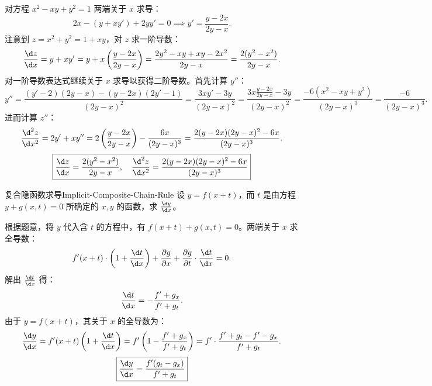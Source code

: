 \begin{solution}
    对方程 $x^2 - xy + y^2 = 1$ 两端关于 $x$ 求导：
    \begin{equation}
        2x - (y + x y') + 2yy' = 0 \implies y' = \frac{y - 2x}{2y - x}.
    \end{equation}
    注意到 $z = x^2 + y^2 = 1 + xy$，对 $z$ 求一阶导数：
    \begin{equation}
        \frac{\d z}{\d x} = y + xy' = y + x \left( \frac{y - 2x}{2y - x} \right) = \frac{2y^2 - xy + xy - 2x^2}{2y - x} = \frac{2(y^2 - x^2)}{2y - x}.
    \end{equation}
    对一阶导数表达式继续关于 $x$ 求导以获得二阶导数。首先计算 $y''$：
    \begin{equation}
        y'' = \frac{(y' - 2)(2y - x) - (y - 2x)(2y' - 1)}{(2y - x)^2} = \frac{3xy' - 3y}{(2y - x)^2} = \frac{3x\frac{y - 2x}{2y - x} - 3y}{(2y - x)^2} = \frac{-6(x^2 - xy + y^2)}{(2y - x)^3} = \frac{-6}{(2y - x)^3}.
    \end{equation}
    进而计算 $z''$：
    \begin{equation}
        \frac{\d^2 z}{\d x^2} = 2y' + xy'' = 2 \left( \frac{y - 2x}{2y - x} \right) - \frac{6x}{(2y - x)^3} = \frac{2(y - 2x)(2y - x)^2 - 6x}{(2y - x)^3}.
    \end{equation}
    \begin{equation}
        \boxed{\frac{\d z}{\d x} = \frac{2(y^2 - x^2)}{2y - x}, \quad \frac{\d^2 z}{\d x^2} = \frac{2(y - 2x)(2y - x)^2 - 6x}{(2y - x)^3}}
    \end{equation}
\end{solution}

\begin{problem}{复合隐函数求导}{Implicit-Composite-Chain-Rule}
    设 $y = f(x + t)$，而 $t$ 是由方程 $y + g(x, t) = 0$ 所确定的 $x, y$ 的函数，求 $\frac{\d y}{\d x}$。
\end{problem}

\begin{solution}
    根据题意，将 $y$ 代入含 $t$ 的方程中，有 $f(x + t) + g(x, t) = 0$。两端关于 $x$ 求全导数：
    \begin{equation}
        f'(x + t) \cdot \left( 1 + \frac{\d t}{\d x} \right) + \frac{\partial g}{\partial x} + \frac{\partial g}{\partial t} \cdot \frac{\d t}{\d x} = 0. \label{eq:total-diff}
    \end{equation}
    解出 $\frac{\d t}{\d x}$ 得：
    \begin{equation}
        \frac{\d t}{\d x} = -\frac{f' + g_x}{f' + g_t}.
    \end{equation}
    由于 $y = f(x + t)$，其关于 $x$ 的全导数为：
    \begin{equation}
        \frac{\d y}{\d x} = f'(x + t) \left( 1 + \frac{\d t}{\d x} \right) = f' \left( 1 - \frac{f' + g_x}{f' + g_t} \right) = f' \cdot \frac{f' + g_t - f' - g_x}{f' + g_t}.
    \end{equation}
    \begin{equation}
        \boxed{\frac{\d y}{\d x} = \frac{f'(g_t - g_x)}{f' + g_t}}
    \end{equation}
\end{solution}

